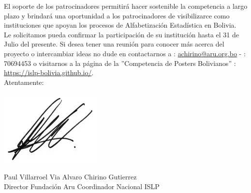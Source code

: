 \documentclass[10.9pt,a4paper]{article}
\begin{document}
El soporte de los patrocinadores permitirá hacer sostenible la competencia a largo plazo y brindará una oportunidad a los patrocinadores de visibilizarce como instituciones que apoyan los procesos de Alfabetización Estadística en Bolivia. \\

Le solicitamos pueda confirmar la participación de su institución hasta el 31 de Julio del presente. Si desea tener una reunión para conocer más acerca del proyecto o intercambiar ideas no dude en contactarnos a \faEnvelopeO: \url{achirino@aru.org.bo} -  \faPhone: 70694453 o visitarnos a la página de la ''Competencia de Posters Bolivianos'' \faGoogle:  \url{https://islp-bolivia.github.io/}.\\

Atentamente:


\begin{center}
\vspace{0.1cm}

\includegraphics[scale=0.8]{firmaPaul}\hspace{5.7cm}


\noindent \hspace{0.2cm}Paul Villarroel Via \hspace{2.7cm}				Alvaro Chirino Gutierrez\\
\hspace{0.5cm}Director Fundación Aru \hspace{1.7cm}	Coordinador Nacional ISLP

\end{center}

\newpage


\end{document}
